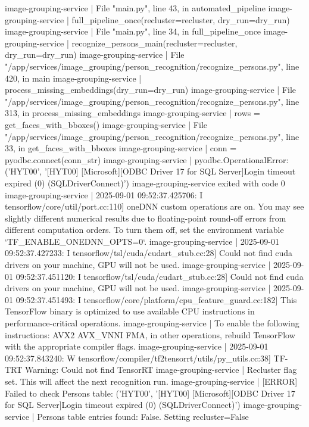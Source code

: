 image-grouping-service  |   File "main.py", line 43, in automated_pipeline
image-grouping-service  |     full_pipeline_once(recluster=recluster, dry_run=dry_run)
image-grouping-service  |   File "main.py", line 34, in full_pipeline_once
image-grouping-service  |     recognize_persons_main(recluster=recluster, dry_run=dry_run)
image-grouping-service  |   File "/app/services/image_grouping/person_recognition/recognize_persons.py", line 420, in main
image-grouping-service  |     process_missing_embeddings(dry_run=dry_run)
image-grouping-service  |   File "/app/services/image_grouping/person_recognition/recognize_persons.py", line 313, in process_missing_embeddings
image-grouping-service  |     rows = get_faces_with_bboxes()
image-grouping-service  |   File "/app/services/image_grouping/person_recognition/recognize_persons.py", line 33, in get_faces_with_bboxes
image-grouping-service  |     conn = pyodbc.connect(conn_str)
image-grouping-service  | pyodbc.OperationalError: ('HYT00', '[HYT00] [Microsoft][ODBC Driver 17 for SQL Server]Login timeout expired (0) (SQLDriverConnect)')
image-grouping-service exited with code 0
image-grouping-service  | 2025-09-01 09:52:37.425706: I tensorflow/core/util/port.cc:110] oneDNN custom operations are on. You may see slightly different numerical results due to floating-point round-off errors from different computation orders. To turn them off, set the environment variable `TF_ENABLE_ONEDNN_OPTS=0`.
image-grouping-service  | 2025-09-01 09:52:37.427233: I tensorflow/tsl/cuda/cudart_stub.cc:28] Could not find cuda drivers on your machine, GPU will not be used.
image-grouping-service  | 2025-09-01 09:52:37.451120: I tensorflow/tsl/cuda/cudart_stub.cc:28] Could not find cuda drivers on your machine, GPU will not be used.
image-grouping-service  | 2025-09-01 09:52:37.451493: I tensorflow/core/platform/cpu_feature_guard.cc:182] This TensorFlow binary is optimized to use available CPU instructions in performance-critical operations.
image-grouping-service  | To enable the following instructions: AVX2 AVX_VNNI FMA, in other operations, rebuild TensorFlow with the appropriate compiler flags.
image-grouping-service  | 2025-09-01 09:52:37.843240: W tensorflow/compiler/tf2tensorrt/utils/py_utils.cc:38] TF-TRT Warning: Could not find TensorRT
image-grouping-service  | Recluster flag set. This will affect the next recognition run.
image-grouping-service  | [ERROR] Failed to check Persons table: ('HYT00', '[HYT00] [Microsoft][ODBC Driver 17 for SQL Server]Login timeout expired (0) (SQLDriverConnect)')
image-grouping-service  | Persons table entries found: False. Setting recluster=False
